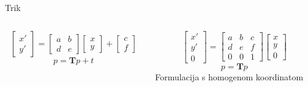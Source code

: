 \documentclass[9pt]{beamer}
\begin{document}
\begin{frame}{Trik}
	\begin{columns}[t]
		\begin{column}{5cm}
			\begin{equation}
			\left[ \begin{array}{c} x' \\ y'  \end{array} \right] = 
			\left[ \begin{array}{cc}
			a & b  \\
			d & e  \end{array} \right] 	\left[ \begin{array}{c} x \\ y  \end{array} \right] + 
			\left[ \begin{array}{c} c \\ f  \end{array} \right]\nonumber
			\end{equation}
			\begin{equation}
			p = \mathbf{T} p +t \nonumber
			\end{equation}
		\end{column}
		\begin{column}{5cm}
			\begin{equation}
			\left[ \begin{array}{c} x' \\ y'\\ 0  \end{array} \right] = 
			\left[ \begin{array}{ccc}
			a & b  & c\\
			d & e  & f \\
			0 & 0 & 1\end{array} \right] 	\left[ \begin{array}{c} x \\ y  \\ 0\end{array} \right]\nonumber
			\end{equation}
			\begin{equation}
			p = \mathbf{T} p \nonumber
			\end{equation}
			Formulacija s homogenom koordinatom
		\end{column}
	\end{columns}
\end{frame}
\end{document}
